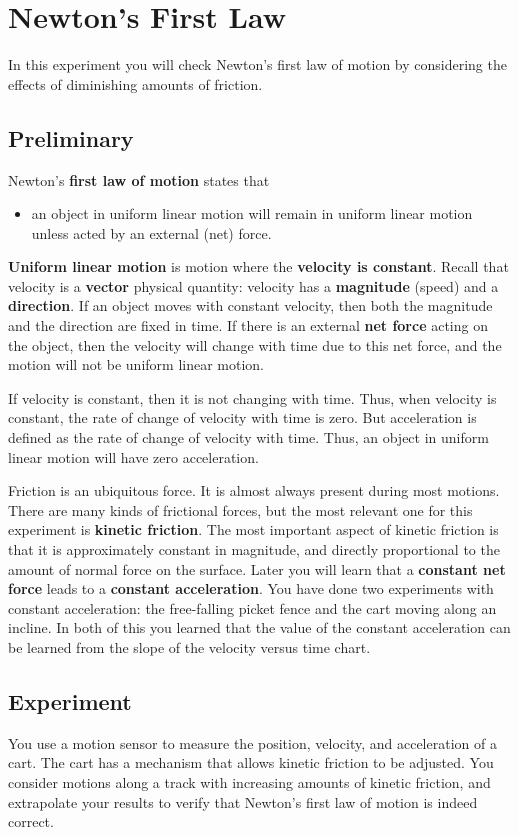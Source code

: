 \chapter{Newton's First Law}
%
In this experiment you will check Newton's first law of motion by considering the effects of diminishing amounts of friction.
%
\section{Preliminary}
%
Newton's \textbf{first law of motion} states that
\begin{itemize}
    \item an object in uniform linear motion will remain in uniform linear motion unless acted by an external (net) force.
\end{itemize}
\textbf{Uniform linear motion} is motion where the \textbf{velocity is constant}. Recall that velocity is a \textbf{vector} physical quantity: velocity has a \textbf{magnitude} (speed) and a \textbf{direction}. If an object moves with constant velocity, then both the magnitude and the direction are fixed in time. If there is an external \textbf{net force} acting on the object, then the velocity will change with time due to this net force, and the motion will not be uniform linear motion.

If velocity is constant, then it is not changing with time. Thus, when velocity is constant, the rate of change of velocity with time is zero. But acceleration is defined as the rate of change of velocity with time. Thus, an object in uniform linear motion will have zero acceleration.

Friction is an ubiquitous force. It is almost always present during most motions. There are many kinds of frictional forces, but the most relevant one for this experiment is \textbf{kinetic friction}. The most important aspect of kinetic friction is that it is approximately constant in magnitude, and directly proportional to the amount of normal force on the surface. Later you will learn that a \textbf{constant net force} leads to a \textbf{constant acceleration}. You have done two experiments with constant acceleration: the free-falling picket fence and the cart moving along an incline. In both of this you learned that the value of the constant acceleration can be learned from the slope of the velocity versus time chart.
%
\section{Experiment}
%
You use a motion sensor to measure the position, velocity, and acceleration of a cart. The cart has a mechanism that allows kinetic friction to be adjusted. You consider motions along a track with increasing amounts of kinetic friction, and extrapolate your results to verify that Newton's first law of motion is indeed correct.
%
